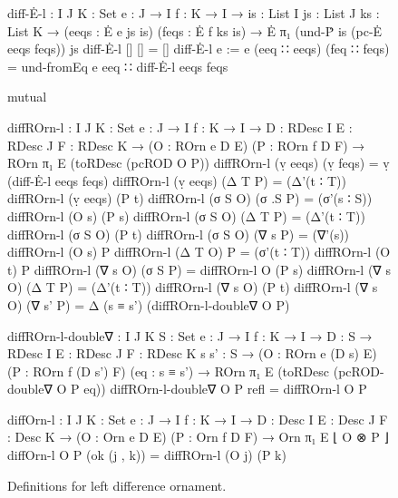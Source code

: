 \begin{figure}
\setlength{\mathindent}{0em}
\begin{code}
diff-Ė-l :
  {I J K : Set} {e : J → I} {f : K → I} →
  {is : List I} {js : List J} {ks : List K} →
  (eeqs : Ė e js is) (feqs : Ė f ks is) → Ė π₁ (und-Ṗ is (pc-Ė eeqs feqs)) js
diff-Ė-l           []            []            = []
diff-Ė-l {e := e}  (eeq ∷ eeqs)  (feq ∷ feqs)  = und-fromEq e eeq ∷ diff-Ė-l eeqs feqs

mutual

  diffROrn-l :
    {I J K : Set} {e : J → I} {f : K → I} →
    {D : RDesc I} {E : RDesc J} {F : RDesc K} →
    (O : ROrn e D E) (P : ROrn f D F) → ROrn π₁ E (toRDesc (pcROD O P))
  diffROrn-l (ṿ eeqs)  (ṿ feqs)   = ṿ (diff-Ė-l eeqs feqs)
  diffROrn-l (ṿ eeqs)  (Δ T P)    = (Δ'(t ∶ T))  diffROrn-l (ṿ eeqs)  (P t)
  diffROrn-l (σ S O)   (σ .S P)   = (σ'(s ∶ S))  diffROrn-l (O s)     (P s)
  diffROrn-l (σ S O)   (Δ T P)    = (Δ'(t ∶ T))  diffROrn-l (σ S O)   (P t)
  diffROrn-l (σ S O)   (∇ s P)    = (∇'(s))      diffROrn-l (O s)     P
  diffROrn-l (Δ T O)   P          = (σ'(t ∶ T))  diffROrn-l (O t)     P
  diffROrn-l (∇ s O)   (σ S P)    =              diffROrn-l O         (P s)
  diffROrn-l (∇ s O)   (Δ T P)    = (Δ'(t ∶ T))  diffROrn-l (∇ s O)   (P t)
  diffROrn-l (∇ s O)   (∇ s' P)   = Δ (s ≡ s') (diffROrn-l-double∇ O P)

  diffROrn-l-double∇ :
    {I J K S : Set} {e : J → I} {f : K → I} →
    {D : S → RDesc I} {E : RDesc J} {F : RDesc K} {s s' : S} →
    (O : ROrn e (D s) E) (P : ROrn f (D s') F) (eq : s ≡ s') →
    ROrn π₁ E (toRDesc (pcROD-double∇ O P eq))
  diffROrn-l-double∇ O P refl = diffROrn-l O P

diffOrn-l :
  {I J K : Set} {e : J → I} {f : K → I} →
  {D : Desc I} {E : Desc J} {F : Desc K} →
  (O : Orn e D E) (P : Orn f D F) → Orn π₁ E ⌊ O ⊗ P ⌋
diffOrn-l O P (ok (j , k)) = diffROrn-l (O j) (P k)
\end{code}
\caption{Definitions for left difference ornament.}
\label{fig:left-difference-ornament}
\end{figure}

